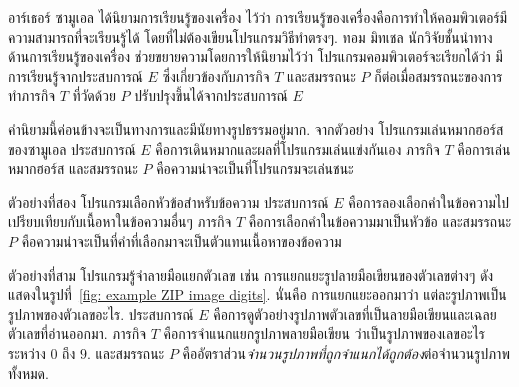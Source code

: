 อาร์เธอร์ ซามูเอล ได้นิยามการเรียนรู้ของเครื่อง ไว้ว่า 
การเรียนรู้ของเครื่องคือการทำให้คอมพิวเตอร์มีความสามารถที่จะเรียนรู้ได้ โดยที่ไม่ต้องเขียนโปรแกรมวิธีทำตรงๆ.
%
ทอม มิทเชล นักวิจัยชั้นนำทางด้านการเรียนรู้ของเครื่อง 
ช่วยขยายความโดยการให้นิยามไว้ว่า
โปรแกรมคอมพิวเตอร์จะเรียกได้ว่า มีการเรียนรู้จากประสบการณ์ $E$ ซึ่งเกี่ยวข้องกับภารกิจ $T$ และสมรรถนะ $P$
ก็ต่อเมื่อสมรรถนะของการทำภารกิจ $T$ ที่วัดด้วย $P$ ปรับปรุงขึ้นได้จากประสบการณ์ $E$
\cite{Mitchell1997a}

คำนิยามนี้ค่อนข้างจะเป็นทางการและมีนัยทางรูปธรรมอยู่มาก.
%
จากตัวอย่าง โปรแกรมเล่นหมากฮอร์สของซามูเอล 
ประสบการณ์ $E$ คือการเดินหมากและผลที่โปรแกรมเล่นแข่งกันเอง
ภารกิจ $T$ คือการเล่นหมากฮอร์ส
และสมรรถนะ $P$ คือความน่าจะเป็นที่โปรแกรมจะเล่นชนะ

ตัวอย่างที่สอง โปรแกรมเลือกหัวข้อสำหรับข้อความ\cite{BleiEtAl2003a} 
ประสบการณ์ $E$ คือการลองเลือกคำในข้อความไปเปรียบเทียบกับเนื้อหาในข้อความอื่นๆ
ภารกิจ $T$ คือการเลือกคำในข้อความมาเป็นหัวข้อ
และสมรรถนะ $P$ คือความน่าจะเป็นที่คำที่เลือกมาจะเป็นตัวแทนเนื้อหาของข้อความ


ตัวอย่างที่สาม โปรแกรมรู้จำลายมือแยกตัวเลข เช่น การแยกแยะรูปลายมือเขียนของตัวเลขต่างๆ ดังแสดงในรูปที่~\ref{fig: example ZIP image digits}. 
นั่นคือ การแยกแยะออกมาว่า แต่ละรูปภาพเป็นรูปภาพของตัวเลขอะไร. 
ประสบการณ์ $E$ คือการดูตัวอย่างรูปภาพตัวเลขที่เป็นลายมือเขียนและเฉลยตัวเลขที่อ่านออกมา.
ภารกิจ $T$ คือการจำแนกแยกรูปภาพลายมือเขียน ว่าเป็นรูปภาพของเลขอะไรระหว่าง $0$ ถึง $9$.
และสมรรถนะ $P$ คืออัตราส่วน\textit{จำนวนรูปภาพที่ถูกจำแนกได้ถูกต้อง}ต่อจำนวนรูปภาพทั้งหมด.


